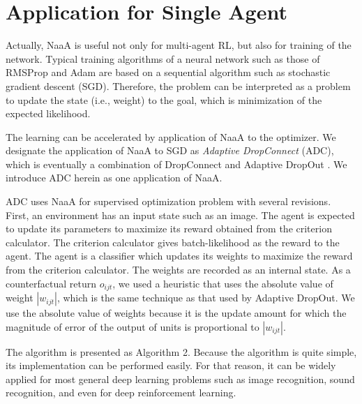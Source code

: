 \section{Application for Single Agent}
Actually, NaaA is useful not only for multi-agent RL, but also for training of the network.
Typical training algorithms of a neural network such as those of RMSProp \citep{tieleman2012lecture} and Adam \citep{kingma2014adam} are based on a sequential algorithm such as stochastic gradient descent (SGD).
Therefore, the problem can be interpreted as a problem to update the state (i.e., weight) to the goal, which is minimization of the expected likelihood.

The learning can be accelerated by application of NaaA to the optimizer.
We designate the application of NaaA to SGD as {\em Adaptive DropConnect} (ADC), 
which is eventually a combination of DropConnect \citep{wan2013regularization} and Adaptive DropOut \citep{ba2013adaptive}.
We introduce ADC herein as one application of NaaA.

ADC uses NaaA for supervised optimization problem with several revisions.
First, an environment has an input state such as an image. The agent is expected to update its parameters to maximize its reward obtained from the criterion calculator.
The criterion calculator gives batch-likelihood as the reward to the agent.
The agent is a classifier which updates its weights to maximize the reward from the criterion calculator.
The weights are recorded as an internal state.
As a counterfactual return $o_{ijt}$, we used a heuristic that uses the absolute value of weight $|w_{ijt}|$, which is the
same technique as that used by Adaptive DropOut.
We use the absolute value of weights because it is the update amount for which the magnitude of error of the output of units is proportional to $|w_{ijt}|$.

The algorithm is presented as Algorithm 2.
Because the algorithm is quite simple, its implementation can be performed easily.
For that reason, it can be widely applied for most general deep learning problems such as 
image recognition, sound recognition, and even for deep reinforcement learning.

